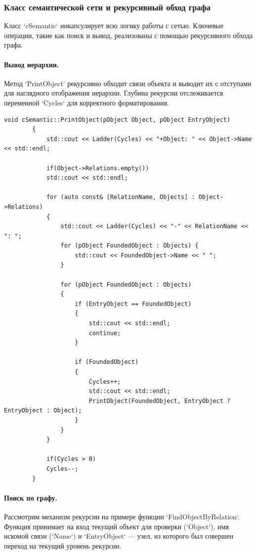 \documentclass[12pt,a4paper]{scrartcl}
\begin{document}
	\subsubsection{Класс семантической сети и рекурсивный обход графа}
	Класс `cSemantic` инкапсулирует всю логику работы с сетью. Ключевые операции, такие как поиск и вывод, реализованы с помощью рекурсивного обхода графа.
	
	\paragraph{Вывод иерархии.} Метод `PrintObject` рекурсивно обходит связи объекта и выводит их с отступами для наглядного отображения иерархии. Глубина рекурсии отслеживается переменной `Cycles` для корректного форматирования.
	\begin{lstlisting}[caption={Рекурсивный вывод структуры сети}]
		void cSemantic::PrintObject(pObject Object, pObject EntryObject)
		{
			std::cout << Ladder(Cycles) << "+Object: " << Object->Name << std::endl;
			
			if(Object->Relations.empty())
			std::cout << std::endl;
			
			for (auto const& [RelationName, Objects] : Object->Relations)
			{
				std::cout << Ladder(Cycles) << "-" << RelationName << ": ";
				for (pObject FoundedObject : Objects) {
					std::cout << FoundedObject->Name << " ";
				}
				
				for (pObject FoundedObject : Objects)
				{
					if (EntryObject == FoundedObject)
					{
						std::cout << std::endl;
						continue;
					}
					
					if (FoundedObject)
					{
						Cycles++;
						std::cout << std::endl;
						PrintObject(FoundedObject, EntryObject ? EntryObject : Object);
					}
				}
			}
			
			if(Cycles > 0)
			Cycles--;
		}
	\end{lstlisting}
	
	\paragraph{Поиск по графу.} Рассмотрим механизм рекурсии на примере функции `FindObjectByRelation`. Функция принимает на вход текущий объект для проверки (`Object`), имя искомой связи (`Name`) и `EntryObject` — узел, из которого был совершен переход на текущий уровень рекурсии.
	
\end{document}
